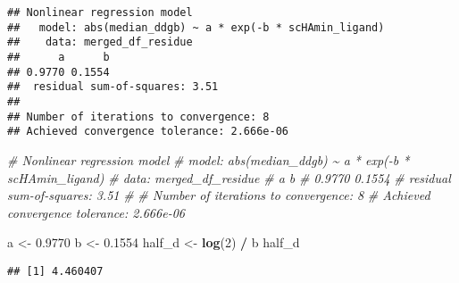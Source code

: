 \documentclass[
]{article}
\newenvironment{Shaded}{\begin{snugshade}}{\end{snugshade}}
\newcommand{\AttributeTok}[1]{\textcolor[rgb]{0.13,0.29,0.53}{#1}}
\newcommand{\CommentTok}[1]{\textcolor[rgb]{0.56,0.35,0.01}{\textit{#1}}}
\newcommand{\ConstantTok}[1]{\textcolor[rgb]{0.56,0.35,0.01}{#1}}
\newcommand{\DecValTok}[1]{\textcolor[rgb]{0.00,0.00,0.81}{#1}}
\newcommand{\FloatTok}[1]{\textcolor[rgb]{0.00,0.00,0.81}{#1}}
\newcommand{\FunctionTok}[1]{\textcolor[rgb]{0.13,0.29,0.53}{\textbf{#1}}}
\newcommand{\NormalTok}[1]{#1}
\newcommand{\OtherTok}[1]{\textcolor[rgb]{0.56,0.35,0.01}{#1}}
\newcommand{\SpecialCharTok}[1]{\textcolor[rgb]{0.81,0.36,0.00}{\textbf{#1}}}
\newcommand{\StringTok}[1]{\textcolor[rgb]{0.31,0.60,0.02}{#1}}
\begin{document}
\begin{verbatim}
## Nonlinear regression model
##   model: abs(median_ddgb) ~ a * exp(-b * scHAmin_ligand)
##    data: merged_df_residue
##      a      b 
## 0.9770 0.1554 
##  residual sum-of-squares: 3.51
## 
## Number of iterations to convergence: 8 
## Achieved convergence tolerance: 2.666e-06
\end{verbatim}

\begin{Shaded}
\begin{Highlighting}[]
\CommentTok{\# Nonlinear regression model}
\CommentTok{\#   model: abs(median\_ddgb) \textasciitilde{} a * exp({-}b * scHAmin\_ligand)}
\CommentTok{\#    data: merged\_df\_residue}
\CommentTok{\#      a      b }
\CommentTok{\# 0.9770 0.1554 }
\CommentTok{\#  residual sum{-}of{-}squares: 3.51}
\CommentTok{\# }
\CommentTok{\# Number of iterations to convergence: 8 }
\CommentTok{\# Achieved convergence tolerance: 2.666e{-}06}

\NormalTok{a }\OtherTok{\textless{}{-}} \FloatTok{0.9770}
\NormalTok{b }\OtherTok{\textless{}{-}}  \FloatTok{0.1554} 
\NormalTok{half\_d }\OtherTok{\textless{}{-}} \FunctionTok{log}\NormalTok{(}\DecValTok{2}\NormalTok{) }\SpecialCharTok{/}\NormalTok{ b  }
\NormalTok{half\_d}
\end{Highlighting}
\end{Shaded}

\begin{verbatim}
## [1] 4.460407
\end{verbatim}

\begin{Shaded}
\end{Shaded}
\end{document}
